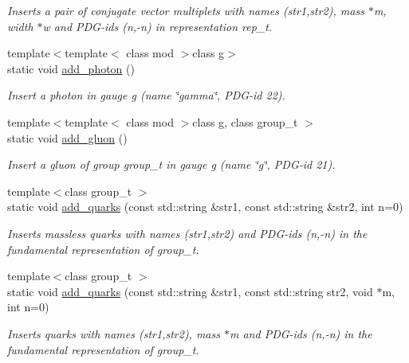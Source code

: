 \begin{DoxyCompactItemize}
\begin{DoxyCompactList}\small\item\em Inserts a pair of conjugate vector multiplets with names (str1,str2), mass $\ast$m, width $\ast$w and P\-D\-G-\/ids (n,-\/n) in representation rep\-\_\-t. \end{DoxyCompactList}\item 
{\footnotesize template$<$template$<$ class mod $>$class g$>$ }\\static void \hyperlink{a00370_a011d03cd0180b4b7fc6cfdee3444a43c}{add\-\_\-photon} ()
\begin{DoxyCompactList}\small\item\em Insert a photon in gauge g (name \char`\"{}gamma\char`\"{}, P\-D\-G-\/id 22). \end{DoxyCompactList}\item 
{\footnotesize template$<$template$<$ class mod $>$class g, class group\-\_\-t $>$ }\\static void \hyperlink{a00370_a72e2d95ddeb7b482732e86b7b45d4b9d}{add\-\_\-gluon} ()
\begin{DoxyCompactList}\small\item\em Insert a gluon of group group\-\_\-t in gauge g (name \char`\"{}g\char`\"{}, P\-D\-G-\/id 21). \end{DoxyCompactList}\item 
{\footnotesize template$<$class group\-\_\-t $>$ }\\static void \hyperlink{a00370_a3e03c5b326768183c974de1e3fa06fc1}{add\-\_\-quarks} (const std\-::string \&str1, const std\-::string \&str2, int n=0)
\begin{DoxyCompactList}\small\item\em Inserts massless quarks with names (str1,str2) and P\-D\-G-\/ids (n,-\/n) in the fundamental representation of group\-\_\-t. \end{DoxyCompactList}\item 
{\footnotesize template$<$class group\-\_\-t $>$ }\\static void \hyperlink{a00370_a865da3783727b5c5e33d3b7345eb0cf1}{add\-\_\-quarks} (const std\-::string \&str1, const std\-::string str2, void $\ast$m, int n=0)
\begin{DoxyCompactList}\small\item\em Inserts quarks with names (str1,str2), mass $\ast$m and P\-D\-G-\/ids (n,-\/n) in the fundamental representation of group\-\_\-t. \end{DoxyCompactList}\item 

\end{DoxyCompactItemize}
